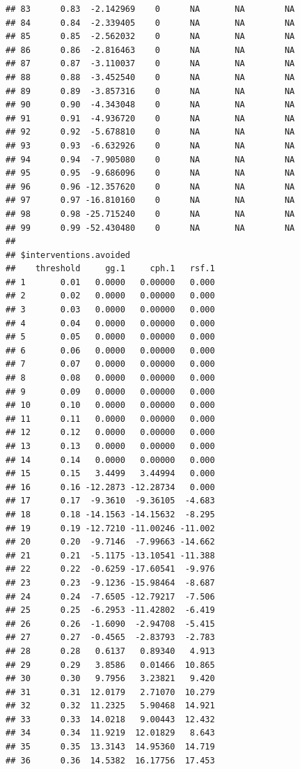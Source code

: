 \documentclass{article}\usepackage[]{graphicx}\usepackage[]{color}
\makeatletter
\newenvironment{kframe}{%
 \def\at@end@of@kframe{}%
 \ifinner\ifhmode%
  \def\at@end@of@kframe{\end{minipage}}%
  \begin{minipage}{\columnwidth}%
 \fi\fi%
 \def\FrameCommand##1{\hskip\@totalleftmargin \hskip-\fboxsep
 \colorbox{shadecolor}{##1}\hskip-\fboxsep
     \hskip-\linewidth \hskip-\@totalleftmargin \hskip\columnwidth}%
 \MakeFramed {\advance\hsize-\width
   \@totalleftmargin\z@ \linewidth\hsize
   \@setminipage}}%
 {\par\unskip\endMakeFramed%
 \at@end@of@kframe}
\newenvironment{knitrout}{}{} %
\makeatother
\begin{document}
\begin{knitrout}
\begin{kframe}
\begin{verbatim}
## 83      0.83  -2.142969    0      NA       NA        NA
## 84      0.84  -2.339405    0      NA       NA        NA
## 85      0.85  -2.562032    0      NA       NA        NA
## 86      0.86  -2.816463    0      NA       NA        NA
## 87      0.87  -3.110037    0      NA       NA        NA
## 88      0.88  -3.452540    0      NA       NA        NA
## 89      0.89  -3.857316    0      NA       NA        NA
## 90      0.90  -4.343048    0      NA       NA        NA
## 91      0.91  -4.936720    0      NA       NA        NA
## 92      0.92  -5.678810    0      NA       NA        NA
## 93      0.93  -6.632926    0      NA       NA        NA
## 94      0.94  -7.905080    0      NA       NA        NA
## 95      0.95  -9.686096    0      NA       NA        NA
## 96      0.96 -12.357620    0      NA       NA        NA
## 97      0.97 -16.810160    0      NA       NA        NA
## 98      0.98 -25.715240    0      NA       NA        NA
## 99      0.99 -52.430480    0      NA       NA        NA
## 
## $interventions.avoided
##    threshold     gg.1     cph.1   rsf.1
## 1       0.01   0.0000   0.00000   0.000
## 2       0.02   0.0000   0.00000   0.000
## 3       0.03   0.0000   0.00000   0.000
## 4       0.04   0.0000   0.00000   0.000
## 5       0.05   0.0000   0.00000   0.000
## 6       0.06   0.0000   0.00000   0.000
## 7       0.07   0.0000   0.00000   0.000
## 8       0.08   0.0000   0.00000   0.000
## 9       0.09   0.0000   0.00000   0.000
## 10      0.10   0.0000   0.00000   0.000
## 11      0.11   0.0000   0.00000   0.000
## 12      0.12   0.0000   0.00000   0.000
## 13      0.13   0.0000   0.00000   0.000
## 14      0.14   0.0000   0.00000   0.000
## 15      0.15   3.4499   3.44994   0.000
## 16      0.16 -12.2873 -12.28734   0.000
## 17      0.17  -9.3610  -9.36105  -4.683
## 18      0.18 -14.1563 -14.15632  -8.295
## 19      0.19 -12.7210 -11.00246 -11.002
## 20      0.20  -9.7146  -7.99663 -14.662
## 21      0.21  -5.1175 -13.10541 -11.388
## 22      0.22  -0.6259 -17.60541  -9.976
## 23      0.23  -9.1236 -15.98464  -8.687
## 24      0.24  -7.6505 -12.79217  -7.506
## 25      0.25  -6.2953 -11.42802  -6.419
## 26      0.26  -1.6090  -2.94708  -5.415
## 27      0.27  -0.4565  -2.83793  -2.783
## 28      0.28   0.6137   0.89340   4.913
## 29      0.29   3.8586   0.01466  10.865
## 30      0.30   9.7956   3.23821   9.420
## 31      0.31  12.0179   2.71070  10.279
## 32      0.32  11.2325   5.90468  14.921
## 33      0.33  14.0218   9.00443  12.432
## 34      0.34  11.9219  12.01829   8.643
## 35      0.35  13.3143  14.95360  14.719
## 36      0.36  14.5382  16.17756  17.453

\end{verbatim}
\end{kframe}
\end{knitrout}
\end{document}
